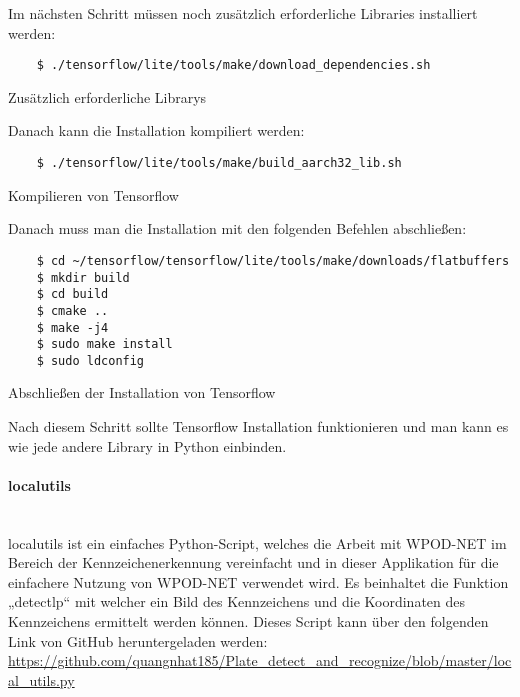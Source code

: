 Im nächsten Schritt müssen noch zusätzlich erforderliche Libraries installiert werden:

\begin{listing}[H]
    \begin{verbatim}
    $ ./tensorflow/lite/tools/make/download_dependencies.sh
    \end{verbatim}
    \caption{Zusätzlich erforderliche Librarys}
\end{listing}

Danach kann die Installation kompiliert werden:

\begin{listing}[H]
    \begin{verbatim}
    $ ./tensorflow/lite/tools/make/build_aarch32_lib.sh
    \end{verbatim}
    \caption{Kompilieren von Tensorflow}
\end{listing}

Danach muss man die Installation mit den folgenden Befehlen abschließen:

\begin{listing}[H]
    \begin{verbatim}
    $ cd ~/tensorflow/tensorflow/lite/tools/make/downloads/flatbuffers
    $ mkdir build
    $ cd build
    $ cmake ..
    $ make -j4
    $ sudo make install
    $ sudo ldconfig
    \end{verbatim}
    \caption{Abschließen der Installation von Tensorflow}
\end{listing}

Nach diesem Schritt sollte Tensorflow Installation funktionieren und man kann es wie jede andere Library in Python einbinden.

\paragraph{localutils}\mbox{}\\
localutils ist ein einfaches Python-Script, welches die Arbeit mit WPOD-NET im Bereich der Kennzeichenerkennung vereinfacht 
und in dieser Applikation für die einfachere Nutzung von WPOD-NET verwendet wird. Es beinhaltet die Funktion „detectlp“ mit 
welcher ein Bild des Kennzeichens und die Koordinaten des Kennzeichens ermittelt werden können. Dieses Script kann über den 
folgenden Link von GitHub heruntergeladen werden: \url{https://github.com/quangnhat185/Plate_detect_and_recognize/blob/master/local_utils.py} 

